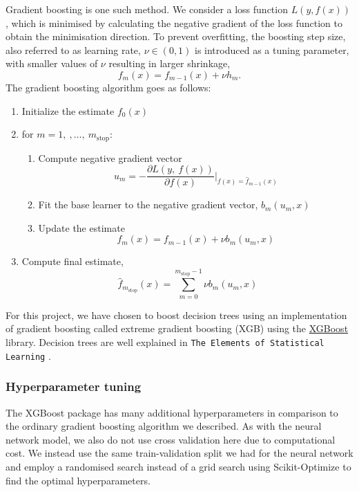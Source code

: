 \documentclass[a4paper, 11pt, twocolumn]{article}
\begin{document}
Gradient boosting is one such method. We consider a loss function $L(y, f(x))$,
which is minimised by calculating the negative gradient of the loss
function to obtain the minimisation direction. To prevent overfitting, the
boosting step size, also referred to as learning rate, $\nu \in (0,1)$ is 
introduced as a tuning parameter, with smaller values of $\nu$ resulting in 
larger shrinkage,  
\begin{equation}
f_m(x)=f_{m-1}(x) + \nu h_m .
\end{equation}
The gradient boosting algorithm goes as follows: \cite{RiccardoGB}
\begin{enumerate}[leftmargin=5mm, itemsep=0pt,  parsep=1pt]
\item Initialize the estimate $f_0(x)$
\item for $m= 1,\ ,\dots,\ m_\text{stop}$:
      \begin{enumerate}[leftmargin=5mm, itemsep=0pt,  parsep=1pt]
            \item Compute negative gradient vector
            \begin{equation*}
                  u_m = -\frac{\partial L(y,\ f(x))}{\partial f(x)} \bigg\vert
                  _{f(x)=\hat{f}_{m-1}(x)}
            \end{equation*}
            \item Fit the base learner to the negative gradient vector,
            $b_m(u_m, x)$
            \item Update the estimate
            \begin{equation*}
                  f_m(x) = f_{m-1}(x) + \nu b_m (u_m, x)
            \end{equation*}
      \end{enumerate}
\item Compute final estimate,
      \begin{equation*}
            \hat{f}_{m_\text{stop}} (x) =
            \sum _{m=0}^{m_\text{stop}-1}\nu b_m(u_m, x)
      \end{equation*}
\end{enumerate}

For this project, we have chosen to boost decision trees using an implementation 
of gradient boosting called extreme gradient boosting (XGB) using the 
\href{https://github.com/dmlc/xgboost}{XGBoost} library. Decision trees are 
well explained in \texttt{The Elements of Statistical Learning} \cite[chapter 9.2]{hastie}.

\subsubsection{Hyperparameter tuning}
The XGBoost package has many additional hyperparameters in comparison to the 
ordinary gradient boosting algorithm we described. 
As with the neural network model, we also do not use cross validation here due 
to computational cost. We instead use the same train-validation split we had for 
the neural network and employ a randomised search instead of a grid search using 
Scikit-Optimize to find the optimal hyperparameters. 
\end{document}
